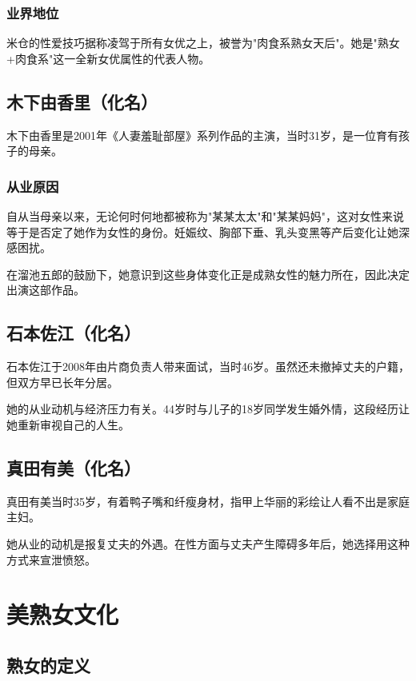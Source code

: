\documentclass[12pt,UTF8]{ctexbook}
\begin{document}
\subsection{业界地位}

米仓的性爱技巧据称凌驾于所有女优之上，被誉为"肉食系熟女天后"。她是"熟女+肉食系"这一全新女优属性的代表人物。

\section{木下由香里（化名）}

木下由香里是2001年《人妻羞耻部屋》系列作品的主演，当时31岁，是一位育有孩子的母亲。

\subsection{从业原因}

自从当母亲以来，无论何时何地都被称为"某某太太"和"某某妈妈"，这对女性来说等于是否定了她作为女性的身份。妊娠纹、胸部下垂、乳头变黑等产后变化让她深感困扰。

在溜池五郎的鼓励下，她意识到这些身体变化正是成熟女性的魅力所在，因此决定出演这部作品。

\section{石本佐江（化名）}

石本佐江于2008年由片商负责人带来面试，当时46岁。虽然还未撤掉丈夫的户籍，但双方早已长年分居。

她的从业动机与经济压力有关。44岁时与儿子的18岁同学发生婚外情，这段经历让她重新审视自己的人生。

\section{真田有美（化名）}

真田有美当时35岁，有着鸭子嘴和纤瘦身材，指甲上华丽的彩绘让人看不出是家庭主妇。

她从业的动机是报复丈夫的外遇。在性方面与丈夫产生障碍多年后，她选择用这种方式来宣泄愤怒。

\chapter{美熟女文化}

\section{熟女的定义}
\end{document}
